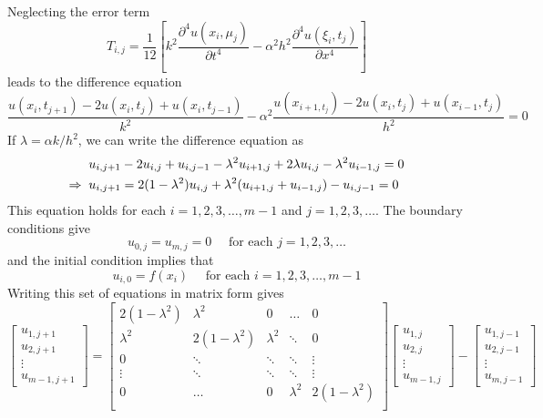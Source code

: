 \documentclass[../main-sheet.tex]{subfiles}
\begin{document}
    Neglecting the error term
    \[T_{i,j}=\frac{1}{12}\left[ k^2\frac{\partial^4 u(x_i,\mu_j)}{\partial t^4}-\alpha^2h^2\frac{\partial^4 u(\xi_i,t_j)}{\partial x^4} \right]\]
    leads to the difference equation
    \[\frac{u(x_i,t_{j+1})-2u(x_i,t_j)+u(x_i,t_{j-1})}{k^2}-\alpha^2\frac{u(x_{i+1,t_j})-2u(x_i,t_j)+u(x_{i-1},t_j)}{h^2}=0\]
    If \(\lambda=\alpha k/h^2\), we can write the difference equation as
    \begin{align}
        &u_{i,j+1}-2u_{i,j}+u_{i,j-1}-\lambda^2 u_{i+1,j}+2\lambda u_{i,j}-\lambda^2u_{i-1,j}=0\notag\\
        \Rightarrow\;\;&u_{i,j+1}=2(1-\lambda^2)u_{i,j}+\lambda^2(u_{i+1,j}+ u_{i-1,j})-u_{i,j-1}=0\label{eq:13.3}
    \end{align}
    This equation holds for each \(i=1,2,3,\dots,m-1\) and \(j=1,2,3,\dots\).
    The boundary conditions give 
    \begin{equation}
        u_{0,j}=u_{m,j}=0 \quad \text{ for each } j=1,2,3,\dots \label{eq:13.4}
    \end{equation}
    and the initial condition implies that
    \begin{equation}
        u_{i,0}=f(x_i)\quad \text{ for each } i=1,2,3,\dots,m-1 \label{eq:13.5}
    \end{equation}
    Writing this set of equations in matrix form gives
    \begin{equation}
        \begin{bmatrix}
            u_{1,j+1}\\u_{2,j+1}\\\vdots\\u_{m-1,j+1}
        \end{bmatrix}=
        \begin{bmatrix}
            2(1-\lambda^2)& \lambda^2 & 0& \dots &0\\
            \lambda^2& 2(1-\lambda^2) & \lambda^2 & \ddots &0\\
            0& \ddots & \ddots & \ddots & \vdots\\
            \vdots& \ddots & \ddots & \ddots & \vdots\\
            0& \dots & 0 & \lambda^2 & 2(1-\lambda^2)\\
        \end{bmatrix}
        \begin{bmatrix}
            u_{1,j}\\u_{2,j}\\\vdots\\u_{m-1,j}
        \end{bmatrix}-
        \begin{bmatrix}
            u_{1,j-1}\\u_{2,j-1}\\\vdots\\u_{m,j-1}
        \end{bmatrix}
        \label{eq:13.6}
    \end{equation}
\end{document}
